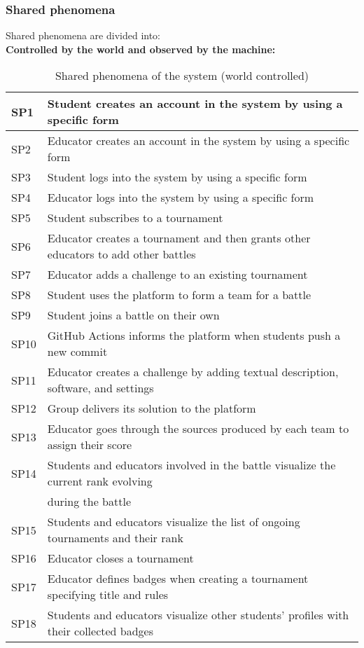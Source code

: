 \subsubsection{Shared phenomena}
Shared phenomena are divided into:\\
\textbf{Controlled by the world and observed by the machine:}
\begin{table}[h]
    \centering
    \begin{tabular}{|l|l|}
        \hline
        SP1 & Student creates an account in the system by using a specific form \\
        \hline
        SP2 & Educator creates an account in the system by using a specific form \\
        \hline
        SP3 & Student logs into the system by using a specific form \\
        \hline
        SP4 & Educator logs into the system by using a specific form \\
        \hline
        SP5 & Student subscribes to a tournament \\
        \hline
        SP6 & Educator creates a tournament and then grants other educators to add other battles \\
        \hline
        SP7 & Educator adds a challenge to an existing tournament \\
        \hline
        SP8 & Student uses the platform to form a team for a battle \\
        \hline
        SP9 & Student joins a battle on their own \\
        \hline
        SP10 & GitHub Actions informs the platform when students push a new commit \\
        \hline
        SP11 & Educator creates a challenge by adding textual description, software, and settings\\
        \hline
        SP12 & Group delivers its solution to the platform \\
        \hline
        SP13 & Educator goes through the sources produced by each team to assign their score \\
        \hline
        SP14 & Students and educators involved in the battle visualize the current rank evolving\\& during the battle \\
        \hline
        SP15 & Students and educators visualize the list of ongoing tournaments and their rank \\
        \hline
        SP16 & Educator closes a tournament \\
        \hline
        SP17 & Educator defines badges when creating a tournament specifying title and rules \\
        \hline
        SP18 & Students and educators visualize other students' profiles with their collected badges\\
        \hline
    \end{tabular}
    \caption{Shared phenomena of the system (world controlled)}
    \label{tab:goals}
\end{table}
